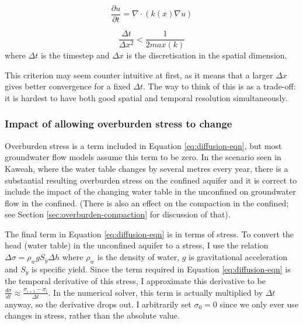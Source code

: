 \documentclass{article}
\begin{document}
\begin{equation}
\frac{\partial u}{\partial t} = \nabla \cdot (k(x) \nabla u)
\label{eq:diffusion-eqn-general}
\end{equation}

\begin{equation}
\frac{\Delta t}{\Delta x ^2} < \frac{1}{2 max(k)}
\label{eq:convergence-criterium}
\end{equation}
where $\Delta t$ is the timestep and $\Delta x$ is the discretisation in the spatial dimension.

This criterion may seem counter intuitive at first, as it means that a larger $\Delta x$ gives better convergence for a fixed $\Delta t$. The way to think of this is as a trade-off: it is hardest to have both good spatial and temporal resolution simultaneously.

\subsubsection{Impact of allowing overburden stress to change}
\label{sec:overburden-gwflow}

Overburden stress is a term included in Equation \ref{eq:diffusion-eqn}, but most groundwater flow models assume this term to be zero. In the scenario seen in Kaweah, where the water table changes by several metres every year, there is a substantial resulting overburden stress on the confined aquifer and it is correct to include the impact of the changing water table in the unconfined on groundwater flow in the confined. (There is also an effect on the compaction in the confined; see Section \ref{sec:overburden-compaction} for discussion of that).

The final term in Equation \ref{eq:diffusion-eqn} is in terms of stress. To convert the head (water table) in the unconfined aquifer to a stress, I use the relation $\Delta \sigma = \rho_w g S_y \Delta h$ where $\rho_w$ is the density of water, $g$ is gravitational acceleration and $S_y$ is specific yield. Since the term required in Equation \ref{eq:diffusion-eqn} is the temporal derivative of this stress, I approximate this derivative to be $\frac{d\sigma}{dt} \approx \frac{\sigma_{i+1} - \sigma_{i}}{\Delta t}$. In the numerical solver, this term is actually multiplied by $\Delta t$ anyway, so the derivative drops out. I arbitrarily set $\sigma_0 = 0$ since we only ever use changes in stress, rather than the absolute value. 
\end{document}
